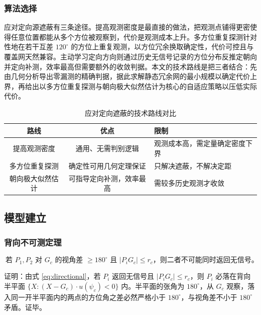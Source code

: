 \documentclass[12pt,a4paper]{ctexart}
\begin{document}
\subsubsection{算法选择}

应对定向源遮蔽有三条途径。提高观测密度是最直接的做法，把观测点铺得更密使得任意位置都能从多个方位被观察到，代价是观测成本上升。多方位重复探测针对性地在若干互差 $120^\circ$ 的方位上重复观测，以方位冗余换取确定性，代价可控且与覆盖网天然兼容。主动学习定向方向则通过历史无信号记录的方位分布反推定朝向并定向补测，效率最高但需要额外的收敛判据。本文的技术路线是把三者结合：先由几何分析导出零漏测的精确判据，据此求解静态冗余网的最小规模以确定代价上界，再给出以多方位重复探测与朝向极大似然估计为核心的自适应策略以压低实际代价。

\begin{table}[H]
  \centering
  \caption{应对定向遮蔽的技术路线对比}
  \label{tab:p4-algo}
  \begin{tabularx}{\textwidth}{CCL}
    \toprule
    路线 & 优点 & 限制 \\
    \midrule
    提高观测密度 & 通用、无需判别逻辑 & 观测成本高，需定量确定密度下界 \\
    多方位重复探测 & 确定性可用几何定理保证 & 只解决遮蔽，不解决定距 \\
    朝向极大似然估计 & 可指导定向补测，效率最高 & 需较多历史观测才收敛 \\
    \bottomrule
  \end{tabularx}
\end{table}

\subsection{模型建立}

\subsubsection{背向不可测定理}

\begin{equation}
\boxed{\ \text{若 }P_1,P_2\text{ 对 $G_c$ 的视角差 }\ge180^\circ
\text{ 且 }|P_iG_c|\le r_c\text{，则二者不可能同时返回无信号。}\ }
\label{eq:theorem1}
\end{equation}

证明：由式 \eqref{eq:directional}，若 $P_i$ 返回无信号且 $|P_iG_c|\le r_c$，则 $P_i$ 必落在背向半平面 $\{X:(X-G_c)\cdot u(\psi_c)<0\}$ 内。半平面的张角为 $180^\circ$，从 $G_c$ 观察，落入同一开半平面内的两点的方位角之差必然严格小于 $180^\circ$，与视角差不小于 $180^\circ$ 矛盾。证毕。
\end{document}
